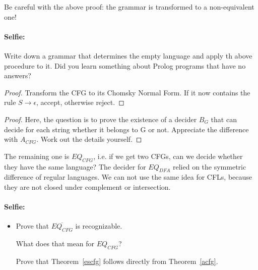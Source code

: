 Be careful with the above proof: the grammar is transformed to a
non-equivalent one!


\paragraph{Selfie:}
Write down a grammar that determines the empty language and apply th
above procedure to it. Did you learn something about Prolog programs
that have no answers?


\begin{proof}
Transform the CFG to its Chomsky Normal Form. If it now contains the
rule $S \rightarrow \epsilon$, accept, otherwise reject.
\end{proof}


\begin{proof}
Here, the question is to prove the existence of a decider $B_G$ that
can decide for each string whether it belongs to G or not. Appreciate
the difference with $A_{CFG}$. Work out the details yourself.
\end{proof} 

The remaining one is $EQ_{CFG}$, i.e. if we get two CFGs, can we
decide whether they have the same language? The decider for $EQ_{DFA}$
relied on the symmetric difference of regular languages. We can not
use the same idea for CFLs, because they are not closed under
complement or intersection.

\paragraph{Selfie:}
\begin{itemize}
\item[]
Prove that $\overline{EQ_{CFG}}$ is recognizable.

What does that mean for $EQ_{CFG}$?

Prove that Theorem~\ref{escfg} follows directly from Theorem~\ref{acfg}.
\end{itemize}



